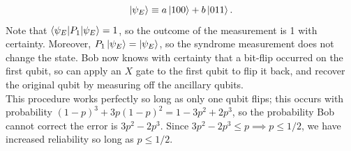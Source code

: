 \documentclass[12pt,a4paper]{report}
\numberwithin{equation}{section}
\theoremstyle{definition}
\theoremstyle{theorem}
\theoremstyle{theorem}
\theoremstyle{example}
\theoremstyle{definition}
\begin{document}
\begin{equation}
	\ket{\psi_{E}}\equiv a\ket{100}+b\ket{011}.
\end{equation}
Note that $\braket{\psi_{E}|P_{1}|\psi_{E}}=1$, so the outcome of the measurement is 1 with certainty. Moreover, $P_{1}\ket{\psi_{E}}=\ket{\psi_{E}}$, so the syndrome measurement does not change the state. Bob now knows with certainty that a bit-flip occurred on the first qubit, so can apply an $X$ gate to the first qubit to flip it back, and recover the original qubit by measuring off the ancillary qubits.\\
This procedure works perfectly so long as only one qubit flips; this occurs with probability $(1-p)^{3}+3p(1-p)^{2}=1-3p^{2}+2p^{3}$, so the probability Bob cannot correct the error is $3p^{2}-2p^{3}$. Since $3p^{2}-2p^{3}\leq p\implies p\leq 1/2$, we have increased reliability so long as $p\leq 1/2$.
\end{document}
